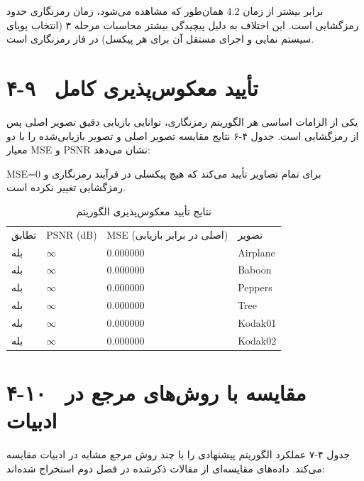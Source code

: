 همان‌طور که مشاهده می‌شود، زمان رمزنگاری حدود ‎4.2‎ برابر بیشتر از زمان رمزگشایی است. این اختلاف به دلیل پیچیدگی بیشتر محاسبات مرحله ۳ (انتخاب پویای سیستم نمایی و اجرای مستقل آن برای هر پیکسل) در فاز رمزنگاری است.

\section{۴-۹  تأیید معکوس‌پذیری کامل}

یکی از الزامات اساسی هر الگوریتم رمزنگاری، توانایی بازیابی دقیق تصویر اصلی پس از رمزگشایی است. جدول ۴-۶ نتایج مقایسه تصویر اصلی و تصویر بازیابی‌شده را با دو معیار ‎MSE‎ و ‎PSNR‎ نشان می‌دهد:

‎MSE=0‎ برای تمام تصاویر تأیید می‌کند که هیچ پیکسلی در فرآیند رمزنگاری و رمزگشایی تغییر نکرده است.

\begin{table}[h]
\centering
\small
\begin{tabular}{llll}
\hline
تطابق & ‎PSNR‎ (‎dB‎) & ‎MSE‎  (اصلی در برابر بازیابی) & تصویر \\
بله & $\infty$ & ‎0.000000‎ & ‎Airplane‎ \\
بله & $\infty$ & ‎0.000000‎ & ‎Baboon‎ \\
بله & $\infty$ & ‎0.000000‎ & ‎Peppers‎ \\
بله & $\infty$ & ‎0.000000‎ & ‎Tree‎ \\
بله & $\infty$ & ‎0.000000‎ & ‎Kodak01‎ \\
بله & $\infty$ & ‎0.000000‎ & ‎Kodak02‎ \\
\hline
\end{tabular}
\caption{نتایج تأیید معکوس‌پذیری الگوریتم}
\end{table}

\section{۴-۱۰  مقایسه با روش‌های مرجع در ادبیات}

جدول ۴-۷ عملکرد الگوریتم پیشنهادی را با چند روش مرجع مشابه در ادبیات مقایسه می‌کند. داده‌های مقایسه‌ای از مقالات ذکرشده در فصل دوم استخراج شده‌اند:

\begin{table}[h]
\centering
\footnotesize
{}
\caption{مقایسه الگوریتم پیشنهادی با روش‌های مرجع}
\end{table}

